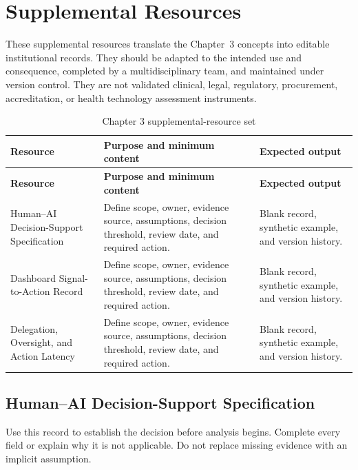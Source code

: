 \section{Supplemental Resources}
\label{sec:comp-ch03-supplemental}

These supplemental resources translate the Chapter~3 concepts into editable
institutional records. They should be adapted to the intended use and consequence,
completed by a multidisciplinary team, and maintained under version control. They
are not validated clinical, legal, regulatory, procurement, accreditation, or health
technology assessment instruments.

\begin{longtable}{@{}p{}p{}p{}@{}}
\caption{Chapter 3 supplemental-resource set}
\label{tab:comp-ch03-supplemental-set}\\
\toprule
\textbf{Resource} & \textbf{Purpose and minimum content} & \textbf{Expected output} \\
\midrule
\endfirsthead
\toprule
\textbf{Resource} & \textbf{Purpose and minimum content} & \textbf{Expected output} \\
\midrule
\endhead
\bottomrule
\endlastfoot
Human–AI Decision-Support Specification & Define scope, owner, evidence source, assumptions, decision threshold, review date, and required action. & Blank record, synthetic example, and version history. \\
Dashboard Signal-to-Action Record & Define scope, owner, evidence source, assumptions, decision threshold, review date, and required action. & Blank record, synthetic example, and version history. \\
Delegation, Oversight, and Action Latency & Define scope, owner, evidence source, assumptions, decision threshold, review date, and required action. & Blank record, synthetic example, and version history. \\
\end{longtable}

\subsection{Human–AI Decision-Support Specification}
\label{sec:comp-ch03-supp-1}
Use this record to establish the decision before analysis begins. Complete every
field or explain why it is not applicable. Do not replace missing evidence with an
implicit assumption.


